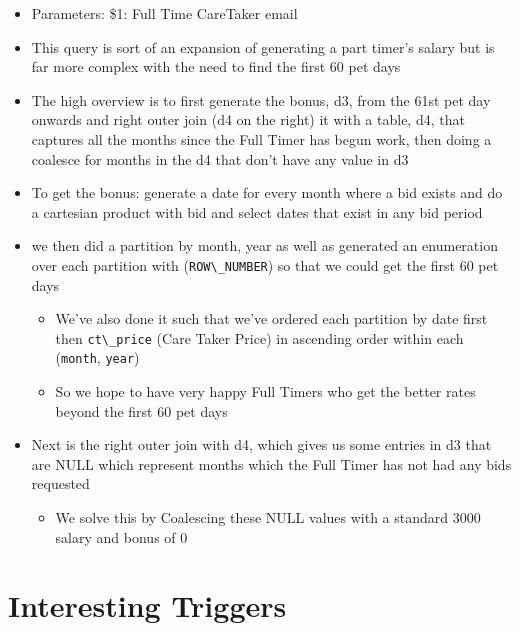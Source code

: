 \documentclass[
  paper=a4,
  ,captions=tableheading
]{scrartcl}
\newcommand{\passthrough}[1]{#1}
\providecommand{\tightlist}{%
  \setlength{\itemsep}{0pt}\setlength{\parskip}{0pt}}
\begin{document}
\begin{itemize}
\tightlist
\item
  Parameters: \$1: Full Time CareTaker email
\item
  This query is sort of an expansion of generating a part timer's salary
  but is far more complex with the need to find the first 60 pet days
\item
  The high overview is to first generate the bonus, d3, from the 61st
  pet day onwards and right outer join (d4 on the right) it with a
  table, d4, that captures all the months since the Full Timer has begun
  work, then doing a coalesce for months in the d4 that don't have any
  value in d3
\item
  To get the bonus: generate a date for every month where a bid exists
  and do a cartesian product with bid and select dates that exist in any
  bid period
\item
  we then did a partition by month, year as well as generated an
  enumeration over each partition with
  (\passthrough{\lstinline!ROW\_NUMBER!}) so that we could get the first
  60 pet days

  \begin{itemize}
  \tightlist
  \item
    We've also done it such that we've ordered each partition by date
    first then \passthrough{\lstinline!ct\_price!} (Care Taker Price) in
    ascending order within each (\passthrough{\lstinline!month!},
    \passthrough{\lstinline!year!})
  \item
    So we hope to have very happy Full Timers who get the better rates
    beyond the first 60 pet days
  \end{itemize}
\item
  Next is the right outer join with d4, which gives us some entries in
  d3 that are NULL which represent months which the Full Timer has not
  had any bids requested

  \begin{itemize}
  \tightlist
  \item
    We solve this by Coalescing these NULL values with a standard 3000
    salary and bonus of 0
  \end{itemize}
\end{itemize}

\hypertarget{interesting-triggers}{%
\section{Interesting Triggers}\label{interesting-triggers}}
\end{document}
